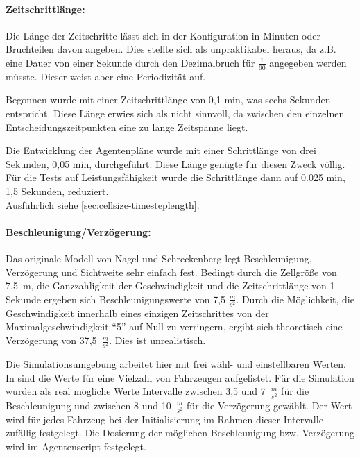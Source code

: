 \paragraph*{Zeitschrittlänge:}
Die Länge der Zeitschritte lässt sich in der Konfiguration in Minuten oder Bruchteilen davon angeben. 
Dies stellte sich als unpraktikabel heraus, da z.B. eine Dauer von einer Sekunde durch den Dezimalbruch für $\frac{1}{60}$ angegeben werden müsste. Dieser weist aber eine Periodizität auf.

Begonnen wurde mit einer Zeitschrittlänge von 0,1 min, was sechs Sekunden entspricht. 
Diese Länge erwies sich als nicht sinnvoll, da zwischen den einzelnen Entscheidungszeitpunkten eine zu lange Zeitspanne liegt.

Die Entwicklung der Agentenpläne wurde mit einer Schrittlänge von drei Sekunden, 0,05 min, durchgeführt. Diese Länge genügte für diesen Zweck völlig.
Für die Tests auf Leistungsfähigkeit wurde die Schrittlänge dann auf 0.025 min, 1,5 Sekunden, reduziert.
\\
Ausführlich siehe \cref{sec:cellsize-timesteplength}.



\paragraph*{Beschleunigung/Verzögerung:}
\label{beschl-verz}
Das originale Modell von Nagel und Schreckenberg legt Beschleunigung, Verzögerung und Sichtweite sehr einfach fest.
Bedingt durch die Zellgröße von \mbox{7,5 m}, die Ganzzahligkeit der Geschwindigkeit und die Zeitschrittlänge von 1 Sekunde ergeben sich Beschleunigungswerte von 7,5 $\frac{m}{s^{2}}$. 
Durch die Möglichkeit, die Geschwindigkeit innerhalb eines einzigen Zeitschrittes von der Maximalgeschwindigkeit \enquote{5} auf Null zu verringern, ergibt sich theoretisch eine Verzögerung von \mbox{37,5 $\frac{m}{s^{2}}$}.
Dies ist unrealistisch.

Die Simulationsumgebung arbeitet hier mit frei wähl- und einstellbaren Werten. 
In \cite{unfallrekonstruktion} sind die Werte für eine Vielzahl von Fahrzeugen aufgelistet. 
Für die Simulation wurden als real mögliche Werte Intervalle zwischen 3,5 und \mbox{7 $\frac{m}{s^{2}}$} für die Beschleunigung und zwischen 8 und \mbox{10 $\frac{m}{s^{2}}$} für die Verzögerung gewählt.
Der Wert wird für jedes Fahrzeug bei der Initialisierung im Rahmen dieser Intervalle zufällig festgelegt.
Die Dosierung der möglichen Beschleunigung bzw. Verzögerung wird im Agentenscript festgelegt.


